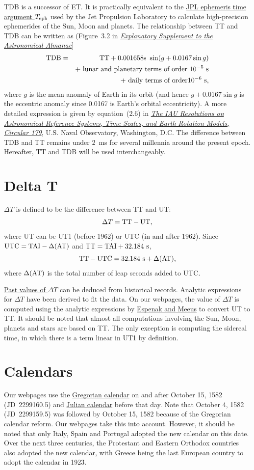 \documentclass[12pt]{article}
\newcommand \beq {\begin{equation}}
\newcommand \eeq {\end{equation}}
\newcommand \beqn {\begin{eqnarray}}
\newcommand \eeqn {\end{eqnarray}}
\newcommand{\expl}{\href{http://www.uscibooks.com/urban.htm}{\it Explanatory Supplement to the Astronomical Almanac}}
\newcommand{\kaplan}{\href{http://aa.usno.navy.mil/publications/docs/Circular_179.pdf}{\it The IAU Resolutions on Astronomical Reference Systems, Time Scales, and Earth Rotation Models, Circular 179}}
\begin{document}
TDB is a successor of ET. It is practically equivalent to the 
\href{https://en.wikipedia.org/wiki/Ephemeris_time#JPL_ephemeris_time_argument_Teph}{JPL ephemeris time argument $T_{\rm eph}$} 
used by the Jet Propulsion Laboratory to calculate high-precision ephemerides of 
the Sun, Moon and planets. The relationship between TT and TDB 
can be written as (Figure~3.2 in \expl ] 
\beqn
  {\rm TDB} &=& {\rm TT} + 0.001658{\rm s}~\sin(g + 0.0167\sin g) \cr 
&& + \mbox{ lunar and planetary terms of order } 10^{-5}~{\rm s} \cr 
&& + \mbox{ daily terms of order} 10^{-6}~{\rm s} , 
\eeqn
where $g$ is the mean anomaly of Earth in its orbit (and hence $g+0.0167\sin g$ is the 
eccentric anomaly since 0.0167 is Earth's orbital eccentricity). 
A more detailed expression is given by equation~(2.6) in 
\kaplan, U.S. Naval Observatory, Washington, D.C. The difference 
between TDB and TT remains under 2~ms for several millennia around the 
present epoch. Hereafter, TT and TDB will be used interchangeably.

\section{Delta T}
\label{sec:DeltaT}

$\Delta T$ is defined to be the difference between TT and UT:
\beq
  \Delta T = {\rm TT - UT} ,
\label{def:DeltaT}
\eeq
where UT can be UT1 (before 1962) or UTC (in and after 1962). Since 
${\rm UTC = TAI} - \Delta ({\rm AT})$ and ${\rm TT = TAI + 32.184~s}$, 
\beq
  {\rm TT - UTC = 32.184~s} + \Delta ({\rm AT}) ,
\eeq
where $\Delta ({\rm AT})$ is the total number of leap seconds added to UTC. 

\href{https://eclipse.gsfc.nasa.gov/LEcat5/deltat.html}{Past values of $\Delta T$} 
can be deduced from historical records. Analytic expressions for $\Delta T$ 
have been derived to fit the data. On our webpages, the value of 
$\Delta T$ is computed using the analytic expressions by 
\href{https://eclipse.gsfc.nasa.gov/SEcat5/deltatpoly.html}{Espenak and Meeus} 
to convert UT to TT. It should be noted that almost all computations involving 
the Sun, Moon, planets and stars are based on TT. The only exception is 
computing the sidereal time, in which there is a term linear in UT1 by 
definition.

\section{Calendars}

Our webpages use the \href{https://en.wikipedia.org/wiki/Gregorian_calendar}{Gregorian calendar} 
on and after October 15, 1582 (JD~2299160.5) and 
\href{https://en.wikipedia.org/wiki/Julian_calendar}{Julian calendar} before that day. 
Note that October 4, 1582 (JD~2299159.5) was followed by October 15, 1582 because 
of the Gregorian calendar reform. Our webpages take this into account. 
However, it should be noted that only Italy, Spain and Portugal adopted 
the new calendar on this date. Over the next three centuries, the Protestant 
and Eastern Orthodox countries also adopted the new calendar, with Greece 
being the last European country to adopt the calendar in 1923. 
\end{document}
